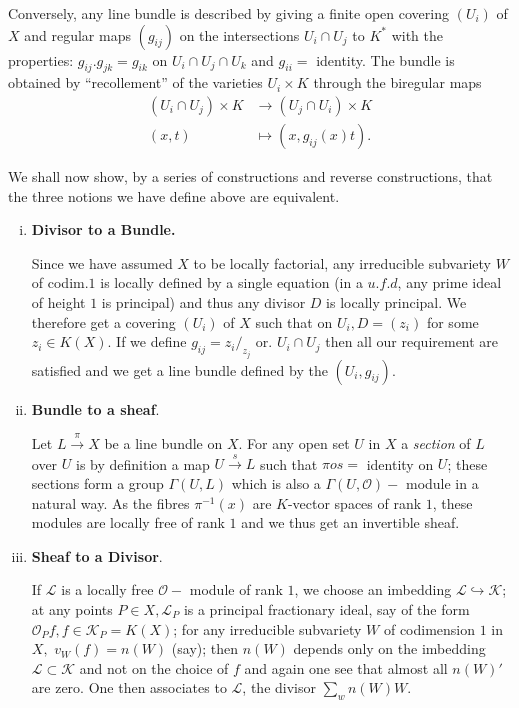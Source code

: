 {Conversely, any line bundle is described by giving a finite open
covering $(U_{i})$ of $X$ and regular maps $(g_{ij})$ on the
intersections $U_{i} \cap U_{j}$ to $K^{*}$ with the properties:
$g_{ij}. g_{jk} = g_{ik}$ on $U_{i} \cap U_{j} \cap U_{k}$ and $g_{ii}
= $ identity. The bundle is obtained by ``recollement'' of the varieties
$U_{i} \times K$ through the biregular maps  
\begin{align*}
  (U_{i} \cap U_{j}) \times K & \to (U_{j} \cap U_{i}) \times K \\
  (x,t) & \mapsto (x, g_{ij}(x)  t).
\end{align*}      
 
 We shall now show, by a series of constructions and reverse
 constructions, that the three notions we have define above are
 equivalent. 

\begin{enumerate}[(i)]
\item {\bf Divisor to a Bundle.}\pageoriginale

Since we have assumed $X$ to be locally factorial, any irreducible
subvariety $W$ of codim.$1$ is locally defined by a single equation
(in a $u.f.d$, any prime ideal of height $1$ is principal) and thus
any divisor $D$ is locally principal. We therefore get a covering
$(U_{i})$ of $X$ such that on $U_{i}, D = (z_{i})$ for some $z_{i} \in
K(X)$. If we define $g_{ij} = z_{i}/_{z_{j}}$ or. $U_{i} \cap U_{j}$
then all our requirement are satisfied and we get a line bundle
defined by the $(U_{i}, g_{ij})$.   

\item{\bf Bundle to a sheaf}.

Let $L \xrightarrow{\pi} X$ be a line bundle on $X$. For any open set
$U$ in $X$ a \textit{section} of $L$ over $U$ is by definition a map
$U \xrightarrow{s} L$ such that $\pi o s = $ identity on $U$; these
sections form a group $\Gamma (U,L)$ which is also a $\Gamma
(U,\mathscr{O})-$ module in a natural way. As the fibres $\pi^{-1}(x)$
are $K$-vector spaces of rank $1$, these modules are locally free of
rank $1$ and we thus get an invertible sheaf. 

\item {\bf Sheaf to a Divisor}.

If $\mathscr{L}$ is a locally free $\mathscr{O}-$ module of rank $1$,
we choose an imbedding $\mathscr{L}\hookrightarrow \mathscr{K}$; at any
points $P \in X, \mathscr{L}_{P}$ is a principal fractionary ideal,
say of the form $\mathscr{O}_{P}f, f \in \mathscr{K}_{P} = K(X)$;  for
any irreducible subvariety $W$ of codimension $1$ in $X,\,\, v_{W}(f)
= n(W)$ (say); then $n(W)$ depends only on the imbedding $\mathscr{L}
\subset \mathscr{K}$ and not on the choice of $f$ and again one see that
almost all $n(W)'$are zero. One then associates to $\mathscr{L}$, the
divisor $\sum \limits _{w} n (W) W$.  


\end{enumerate}}
